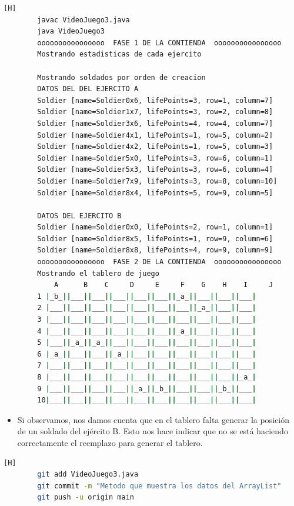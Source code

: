 \documentclass{article}
\begin{document}
	\begin{lstlisting}[language=bash,caption={Compilando y probando}][H]
		javac VideoJuego3.java
		java VideoJuego3
		oooooooooooooooo  FASE 1 DE LA CONTIENDA  oooooooooooooooo
		Mostrando estadisticas de cada ejercito
		
		Mostrando soldados por orden de creacion
		DATOS DEL DEL EJERCITO A
		Soldier [name=Soldier0x6, lifePoints=3, row=1, column=7]
		Soldier [name=Soldier1x7, lifePoints=3, row=2, column=8]
		Soldier [name=Soldier3x6, lifePoints=4, row=4, column=7]
		Soldier [name=Soldier4x1, lifePoints=1, row=5, column=2]
		Soldier [name=Soldier4x2, lifePoints=1, row=5, column=3]
		Soldier [name=Soldier5x0, lifePoints=3, row=6, column=1]
		Soldier [name=Soldier5x3, lifePoints=3, row=6, column=4]
		Soldier [name=Soldier7x9, lifePoints=3, row=8, column=10]
		Soldier [name=Soldier8x4, lifePoints=5, row=9, column=5]
		
		DATOS DEL EJERCITO B
		Soldier [name=Soldier0x0, lifePoints=2, row=1, column=1]
		Soldier [name=Soldier8x5, lifePoints=1, row=9, column=6]
		Soldier [name=Soldier8x8, lifePoints=4, row=9, column=9]
		oooooooooooooooo  FASE 2 DE LA CONTIENDA  oooooooooooooooo
		Mostrando el tablero de juego
			A      B    C     D     E     F    G    H    I     J
		1 |_b_||___||___||___||___||___||_a_||___||___||___|
		2 |___||___||___||___||___||___||___||_a_||___||___|
		3 |___||___||___||___||___||___||___||___||___||___|
		4 |___||___||___||___||___||___||_a_||___||___||___|
		5 |___||_a_||_a_||___||___||___||___||___||___||___|
		6 |_a_||___||___||_a_||___||___||___||___||___||___|
		7 |___||___||___||___||___||___||___||___||___||___|
		8 |___||___||___||___||___||___||___||___||___||_a_|
		9 |___||___||___||___||_a_||_b_||___||___||_b_||___|
		10|___||___||___||___||___||___||___||___||___||___|
	\end{lstlisting}
	
	\begin{itemize}	
		\item Si observamos, nos damos cuenta que en el tablero falta generar la posición de un soldado del ejército B. Esto nos hace indicar que no se está haciendo correctamente el reemplazo para generar el tablero.
	\end{itemize}
	
		
	\begin{lstlisting}[language=bash,caption={Commit: Método que muestra los datos del ArrayList}][H]
		git add VideoJuego3.java
		git commit -m "Metodo que muestra los datos del ArrayList"			
		git push -u origin main
	\end{lstlisting}
	
\end{document}
